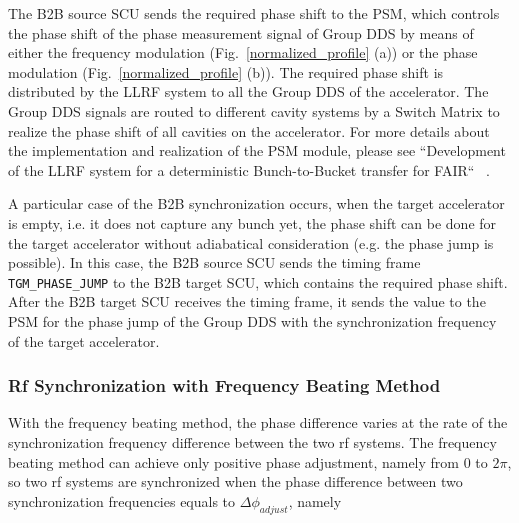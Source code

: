 The B2B source SCU sends the required phase shift to the \gls{PSM}, which controls the phase shift of the phase measurement signal of Group DDS by means of either the frequency modulation (Fig.~\ref{normalized_profile} (a)) or the phase modulation (Fig.~\ref{normalized_profile} (b)). The required phase shift is distributed by the LLRF system to all the Group DDS of the accelerator. The Group DDS signals are routed to different cavity systems by a Switch Matrix to realize the phase shift of all cavities on the accelerator. For more details about the implementation and realization of the PSM module, please see ``Development of the LLRF system for a deterministic Bunch-to-Bucket transfer for FAIR`` ~\cite{ferrand_development_nodate}.

A particular case of the B2B synchronization occurs, when the target accelerator is empty, i.e. it does not capture any bunch yet, the phase shift can be done for the target accelerator without adiabatical consideration (e.g. the phase jump is possible). In this case, the B2B source SCU sends the timing frame \verb|TGM_PHASE_JUMP| to the B2B target SCU, which contains the required phase shift. After the B2B target SCU receives the timing frame, it sends the value to the PSM for the phase jump of the Group DDS with the synchronization frequency of the target accelerator.

\subsubsection{Rf Synchronization with Frequency Beating Method}

With the frequency beating method, the phase difference varies at the rate of the synchronization frequency difference between the two rf systems. The frequency beating method can achieve only positive phase adjustment, namely from 0 to $2\pi$, so two rf systems are synchronized when the phase difference between two synchronization frequencies equals to $\Delta \phi_\mathit{adjust}$, namely
%
%
%
%

